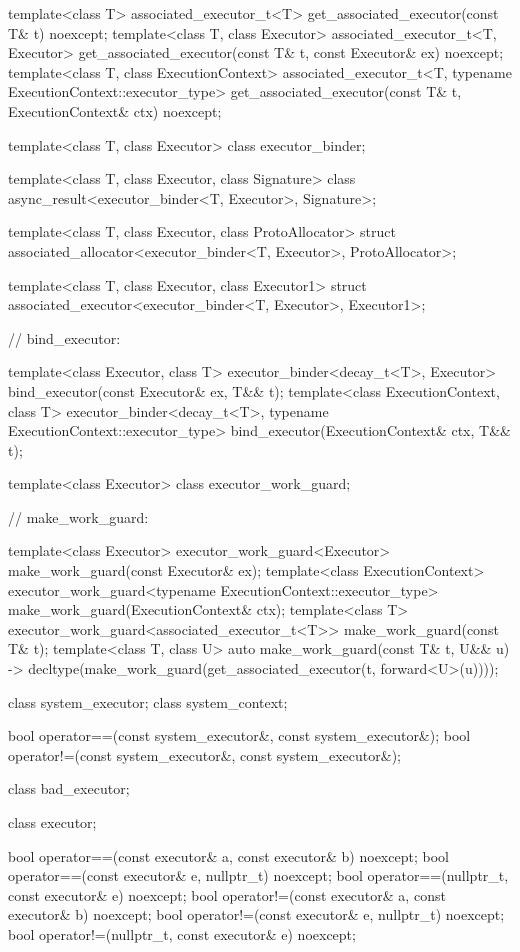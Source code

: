 \begin{codeblock}
{{{{  template<class T>
    associated_executor_t<T> get_associated_executor(const T& t) noexcept;
  template<class T, class Executor>
    associated_executor_t<T, Executor>
      get_associated_executor(const T& t, const Executor& ex) noexcept;
  template<class T, class ExecutionContext>
    associated_executor_t<T, typename ExecutionContext::executor_type>
      get_associated_executor(const T& t, ExecutionContext& ctx) noexcept;

  template<class T, class Executor>
    class executor_binder;

  template<class T, class Executor, class Signature>
    class async_result<executor_binder<T, Executor>, Signature>;

  template<class T, class Executor, class ProtoAllocator>
    struct associated_allocator<executor_binder<T, Executor>, ProtoAllocator>;

  template<class T, class Executor, class Executor1>
    struct associated_executor<executor_binder<T, Executor>, Executor1>;

  // bind_executor:

  template<class Executor, class T>
    executor_binder<decay_t<T>, Executor>
      bind_executor(const Executor& ex, T&& t);
  template<class ExecutionContext, class T>
    executor_binder<decay_t<T>, typename ExecutionContext::executor_type>
      bind_executor(ExecutionContext& ctx, T&& t);

  template<class Executor>
    class executor_work_guard;

  // make_work_guard:

  template<class Executor>
    executor_work_guard<Executor>
      make_work_guard(const Executor& ex);
  template<class ExecutionContext>
    executor_work_guard<typename ExecutionContext::executor_type>
      make_work_guard(ExecutionContext& ctx);
  template<class T>
    executor_work_guard<associated_executor_t<T>>
      make_work_guard(const T& t);
  template<class T, class U>
    auto make_work_guard(const T& t, U&& u)
      -> decltype(make_work_guard(get_associated_executor(t, forward<U>(u))));

  class system_executor;
  class system_context;

  bool operator==(const system_executor&, const system_executor&);
  bool operator!=(const system_executor&, const system_executor&);

  class bad_executor;

  class executor;

  bool operator==(const executor& a, const executor& b) noexcept;
  bool operator==(const executor& e, nullptr_t) noexcept;
  bool operator==(nullptr_t, const executor& e) noexcept;
  bool operator!=(const executor& a, const executor& b) noexcept;
  bool operator!=(const executor& e, nullptr_t) noexcept;
  bool operator!=(nullptr_t, const executor& e) noexcept;

}}}}
\end{codeblock}
